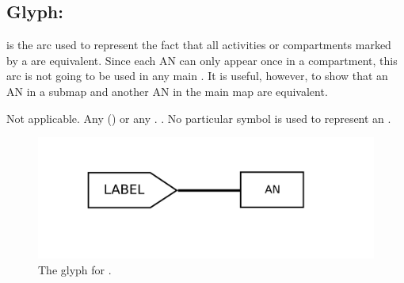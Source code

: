 
\subsection{Glyph:  }\label{sec:equivalenceArc}

 is the arc used to represent the fact that all activities or compartments
marked by a  are equivalent.  Since each AN can only appear once in a compartment, this arc is not going to be used in any main \AFm.  It is useful, however, to show that an AN in a submap and another AN in the main map are equivalent.

\begin{glyphDescription}
 \glyphSboTerm Not applicable.
 \glyphOrigin Any  () or any .
 \glyphTarget {}.
 \glyphEndPoint No particular symbol is used to represent an .
 \end{glyphDescription}

\begin{figure}[H]
  \centering
  \includegraphics[scale = 0.4]{images/equivalence}
  \caption{The \AF glyph for .}
  \label{fig:equivalence}
\end{figure}
